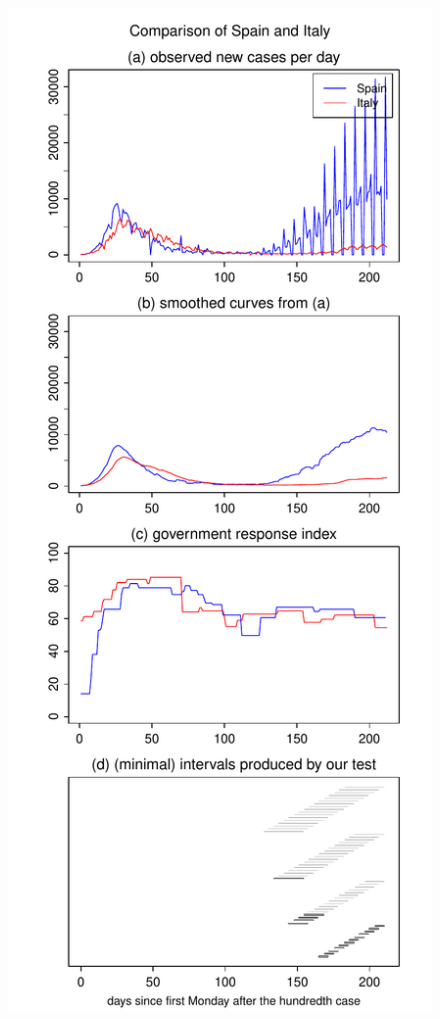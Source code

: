 \documentclass[a4paper,12pt]{article}
\numberwithin{equation}{section}
\begin{document}
\begin{figure}[p!]
\begin{minipage}[t]{0.49\textwidth}
\includegraphics[width=\textwidth]{plots/ESP_vs_ITA_long}

\end{minipage}
\end{figure}
\end{document}
